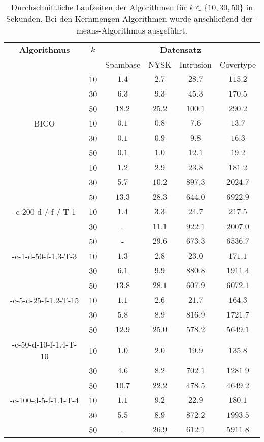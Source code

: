 \begin{table}[h]
\centering
\begin{tabular}{@{}cccccc@{}} \toprule
	\textbf{Algorithmus} & $k$ & \multicolumn{4}{c}{\textbf{Datensatz}} \\
	\cmidrule(r){3-6} & 		& Spambase 				& NYSK 				& Intrusion 			& Covertype \\ \toprule
	\Skmpp 						& 10 & $1.4$ 			& $2.7$ 			& $28.7$ 				& $115.2$ \\
		 						& 30 & $6.3$ 			& $9.3$ 			& $45.3$ 				& $170.5$ \\
		 						& 50 & $18.2$ 			& $25.2$ 			& $100.1$ 				& $290.2$ \\
	\midrule
	BICO 						& 10 & $0.1$ 			& $0.8$ 			& $7.6$ 				& $13.7$ \\
			 					& 30 & $0.1$ 			& $0.9$ 			& $9.8$ 				& $16.3$ \\
		 						& 50 & $0.1$ 			& $1.0$ 			& $12.1$ 				& $19.2$ \\
	\midrule
	\kmpp 						& 10 & $1.2$ 			& $2.9$ 			& $23.8$ 				& $181.2$ \\
			 					& 30 & $5.7$ 			& $10.2$ 			& $897.3$ 				& $2024.7$ \\
		 						& 50 & $13.3$ 			& $28.3$ 			& $644.0$ 				& $6922.9$ \\
	\midrule
	\KCsTwo-c-200-d-/-f-/-T-1	& 10 & $1.4$			& $3.3$				& $24.7$ 				& $217.5$ \\
			 					& 30 & - 				& $11.1$			& $922.1$ 				& $2007.0$ \\
		 						& 50 & - 				& $29.6$			& $673.3$ 				& $6536.7$ \\
	\midrule
	\KCsTwo-c-1-d-50-f-1.3-T-3	& 10 & $1.3$ 			& $2.8$ 			& $23.0$ 				& $171.1$ \\
			 					& 30 & $6.1$ 			& $9.9$ 			& $880.8$ 				& $1911.4$ \\
		 						& 50 & $13.8$ 			& $28.1$ 			& $607.9$ 				& $6072.1$ \\
	\midrule
	\KCsTwo-c-5-d-25-f-1.2-T-15	& 10 & $1.1$ 			& $2.6$ 			& $21.7$ 				& $164.3$ \\
			 					& 30 & $5.8$ 			& $8.9$ 			& $816.9$ 				& $1721.7$ \\
		 						& 50 & $12.9$ 			& $25.0$ 			& $578.2$ 				& $5649.1$ \\
	\midrule
	\KCsTwo-c-50-d-10-f-1.4-T-10& 10 & $1.0$ 			& $2.0$ 			& $19.9$ 				& $135.8$ \\
			 					& 30 & $4.6$ 			& $8.2$ 			& $702.1$ 				& $1281.9$ \\
		 						& 50 & $10.7$ 			& $22.2$ 			& $478.5$ 				& $4649.2$ \\
	\midrule
	\KCsTwo-c-100-d-5-f-1.1-T-4	& 10 & $1.1$ 			& $9.2$ 			& $22.9$ 				& $180.1$ \\
			 					& 30 & $5.5$ 			& $8.9$				& $872.2$ 				& $1993.5$ \\
		 						& 50 & - 				& $26.9$ 			& $612.1$ 				& $5911.8$ \\
	\bottomrule
\end{tabular}
\caption{Durchschnittliche Laufzeiten der Algorithmen für $k \in \{ 10, 30, 50 \}$ in Sekunden. Bei den Kernmengen-Algorithmen
wurde anschließend der \kmpp-means-Algorithmus ausgeführt.}
\label{tbl:experiment-coresets-kernel-runtime-kmpp}
\end{table}
